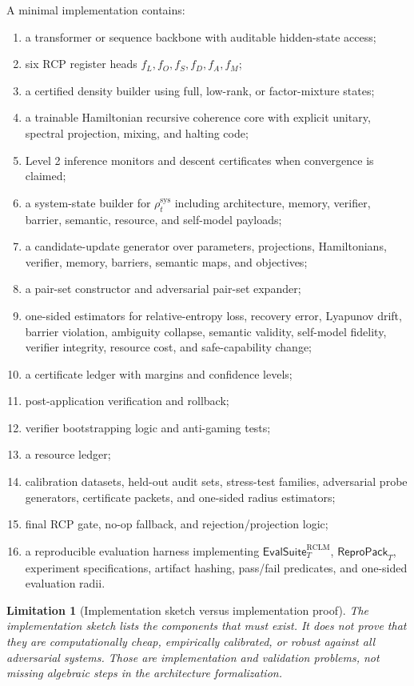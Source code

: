 \documentclass[11pt,a4paper]{article}
\newtheorem{limitation}[theorem]{Limitation}
\newcommand{\RCLM}{\mathrm{RCLM}}
\newcommand{\sys}{\mathrm{sys}}
\begin{document}
A minimal implementation contains:
\begin{enumerate}[leftmargin=1.5em]
    \item a transformer or sequence backbone with auditable hidden-state access;
    \item six RCP register heads \(f_L,f_O,f_S,f_D,f_A,f_M\);
    \item a certified density builder using full, low-rank, or factor-mixture states;
    \item a trainable Hamiltonian recursive coherence core with explicit unitary, spectral projection, mixing, and halting code;
    \item Level 2 inference monitors and descent certificates when convergence is claimed;
    \item a system-state builder for \(\rho_t^{\sys}\) including architecture, memory, verifier, barrier, semantic, resource, and self-model payloads;
    \item a candidate-update generator over parameters, projections, Hamiltonians, verifier, memory, barriers, semantic maps, and objectives;
    \item a pair-set constructor and adversarial pair-set expander;
    \item one-sided estimators for relative-entropy loss, recovery error, Lyapunov drift, barrier violation, ambiguity collapse, semantic validity, self-model fidelity, verifier integrity, resource cost, and safe-capability change;
    \item a certificate ledger with margins and confidence levels;
    \item post-application verification and rollback;
    \item verifier bootstrapping logic and anti-gaming tests;
    \item a resource ledger;
    \item calibration datasets, held-out audit sets, stress-test families, adversarial probe generators, certificate packets, and one-sided radius estimators;
    \item final RCP gate, no-op fallback, and rejection/projection logic;
    \item a reproducible evaluation harness implementing \(\mathsf{EvalSuite}^{\RCLM}_T\), \(\mathsf{ReproPack}_T\), experiment specifications, artifact hashing, pass/fail predicates, and one-sided evaluation radii.
\end{enumerate}

\begin{limitation}[Implementation sketch versus implementation proof]
The implementation sketch lists the components that must exist.  It does not prove that they are computationally cheap, empirically calibrated, or robust against all adversarial systems.  Those are implementation and validation problems, not missing algebraic steps in the architecture formalization.
\end{limitation}
\end{document}
